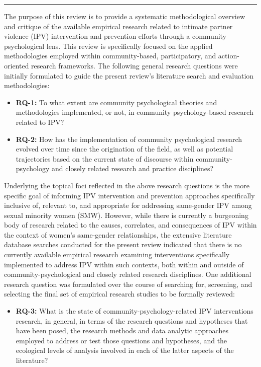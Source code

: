 \documentclass[11pt,]{tufte-book}
\providecommand{\tightlist}{%
  \setlength{\itemsep}{0pt}\setlength{\parskip}{0pt}}
\newcommand{\Frule}{
    \vspace*{-1em}
    \begin{fullwidth}\textcolor{blublk}{\rule{\linewidth}{0.2mm}}\end{fullwidth}
}
\begin{document}
\Frule

\doublespacing

The purpose of this review is to provide a systematic methodological
overview and critique of the available empirical research related to
intimate partner violence (IPV) intervention and prevention efforts
through a community psychological lens. This review is specifically
focused on the applied methodologies employed within community-based,
participatory, and action-oriented research frameworks. The following
general research questions were initially formulated to guide the
present review's literature search and evaluation methodologies:

\singlespacing

\begin{itemize}
\item
  \textbf{RQ-1:} To what extent are community psychological theories and
  methodologies implemented, or not, in community psychology-based
  research related to IPV?
\item
  \textbf{RQ-2:} How has the implementation of community psychological
  research evolved over time since the origination of the field, as well
  as potential trajectories based on the current state of discourse
  within community-psychology and closely related research and practice
  disciplines?
\end{itemize}

\doublespacing

Underlying the topical foci reflected in the above research questions is
the more specific goal of informing IPV intervention and prevention
approaches specifically inclusive of, relevant to, and appropriate for
addressing same-gender IPV among sexual minority women (SMW). However,
while there is currently a burgeoning body of research related to the
causes, correlates, and consequences of IPV within the context of
women's same-gender relationships, the extensive literature database
searches conducted for the present review indicated that there is no
currently available empirical research examining interventions
specifically implemented to address IPV within such contexts, both
within and outside of community-psychological and closely related
research disciplines. One additional research question was formulated
over the course of searching for, screening, and selecting the final set
of empirical research studies to be formally reviewed:

\singlespacing

\begin{itemize}
\tightlist
\item
  \textbf{RQ-3:} What is the state of community-psychology-related IPV
  interventions research, in general, in terms of the research questions
  and hypotheses that have been posed, the research methods and data
  analytic approaches employed to address or test those questions and
  hypotheses, and the ecological levels of analysis involved in each of
  the latter aspects of the literature?
\end{itemize}
\end{document}
